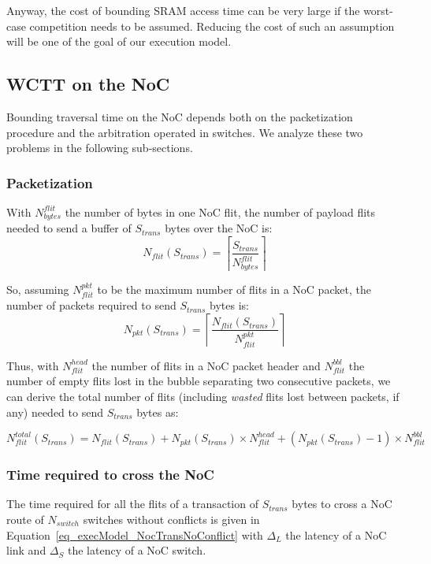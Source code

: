 \documentclass[main.tex]{subfiles}
\begin{document}
Anyway, the cost of bounding SRAM access time can be very large if the worst-case competition needs to be assumed. Reducing the cost of such an assumption will be one of the goal of our execution model.


\subsection{WCTT on the NoC}
\label{ssec_execModel_WCTTNoC}
Bounding traversal time on the NoC depends both on the packetization procedure and the arbitration operated in switches. We analyze these two problems in the following sub-sections.


\subsubsection{Packetization}
With $N_{bytes}^{flit}$ the number of bytes in one NoC flit, the number of payload flits needed to send a buffer of $S_{trans}$ bytes over the NoC is:
\begin{displaymath}
    N_{flit} ( S_{trans} ) = 
    \left\lceil \dfrac{S_{trans}}{N_{bytes}^{flit}} \right\rceil
\end{displaymath}

So, assuming $N_{flit}^{pkt}$ to be the maximum number of flits in a NoC packet, the number of packets required to send $S_{trans}$ bytes is:
\begin{displaymath}
    N_{pkt} ( S_{trans} ) = 
    \left\lceil \dfrac{ N_{flit}(S_{trans}) }{N_{flit}^{pkt}} \right\rceil
\end{displaymath}

Thus, with $N_{flit}^{head}$ the number of flits in a NoC packet header and $N_{flit}^{bbl}$ the number of empty flits lost in the bubble separating two consecutive packets, we can derive the total number of flits (including \emph{wasted} flits lost between packets, if any) needed to send $S_{trans}$ bytes as:

\begin{displaymath}
    N_{flit}^{total} ( S_{trans} ) =
    N_{flit} ( S_{trans} ) +
    N_{pkt} ( S_{trans} ) \times N_{flit}^{head} +
    (N_{pkt} ( S_{trans} ) - 1) \times N_{flit}^{bbl}
\end{displaymath}


\subsubsection{Time required to cross the NoC}
\label{sssec_execModel_NoCbounds}
The time required for all the flits of a transaction of $S_{trans}$ bytes to cross a NoC route of $N_{switch}$ switches without conflicts is given in Equation~\ref{eq_execModel_NocTransNoConflict} with $\Delta_L$ the latency of a NoC link and $\Delta_S$ the latency of a NoC switch.
\end{document}
